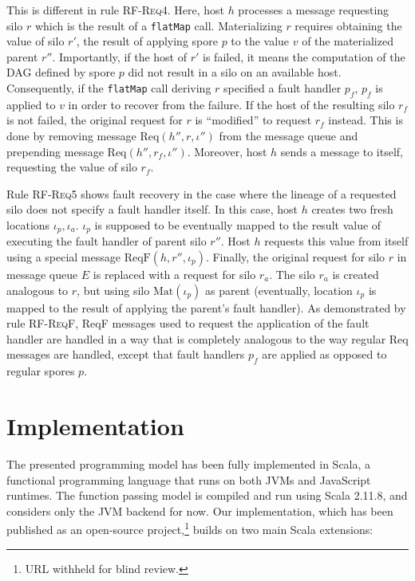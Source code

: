 \documentclass[preprint]{sigplanconf}
\theoremstyle{definition}
\theoremstyle{definition}
\begin{document}
This is different in rule \textsc{RF-Req4}. Here, host $h$ processes a message
requesting silo $r$ which is the result of a \texttt{flatMap} call.
Materializing $r$ requires obtaining the value of silo $r'$, the result of
applying spore $p$ to the value $v$ of the materialized parent $r''$.
Importantly, if the host of $r'$ is failed, it means the computation of the DAG
defined by spore $p$ did not result in a silo on an available host.
Consequently, if the \texttt{flatMap} call deriving $r$ specified a fault
handler $p_f$, $p_f$ is applied to $v$ in order to recover from the failure.
If the host of the resulting silo $r_f$ is not failed, the original request for
$r$ is ``modified'' to request $r_f$ instead. This is done by removing message
$\text{Req}(h'', r, \iota'')$ from the message queue and prepending message
$\text{Req}(h'', r_f, \iota'')$. Moreover, host $h$ sends a message to itself,
requesting the value of silo $r_f$.

Rule \textsc{RF-Req5} shows fault recovery in the case where the lineage of a
requested silo does not specify a fault handler itself. In this case, host $h$
creates two fresh locations $\iota_p, \iota_a$. $\iota_p$ is supposed to be
eventually mapped to the result value of executing the fault handler of parent
silo $r''$. Host $h$ requests this value from itself using a special message
$\text{ReqF}(h, r'', \iota_p)$. Finally, the original request for silo $r$ in
message queue $E$ is replaced with a request for silo $r_a$. The silo $r_a$ is
created analogous to $r$, but using silo $\text{Mat}(\iota_p)$ as parent
(eventually, location $\iota_p$ is mapped to the result of applying the
parent's fault handler). As demonstrated by rule \textsc{RF-ReqF}, ReqF
messages used to request the application of the fault handler are handled in a
way that is completely analogous to the way regular Req messages are handled,
except that fault handlers $p_f$ are applied as opposed to regular spores $p$.

\section{Implementation}
\label{sec:implementation}

The presented programming model has been fully implemented in Scala, a
functional programming language that runs on both JVMs and JavaScript runtimes.
The function passing model is compiled and run using Scala 2.11.8, and considers only the JVM backend
for now. Our implementation, which has been published as an open-source
project,\footnote{URL withheld for blind review.} builds on two
main Scala extensions:
\end{document}
